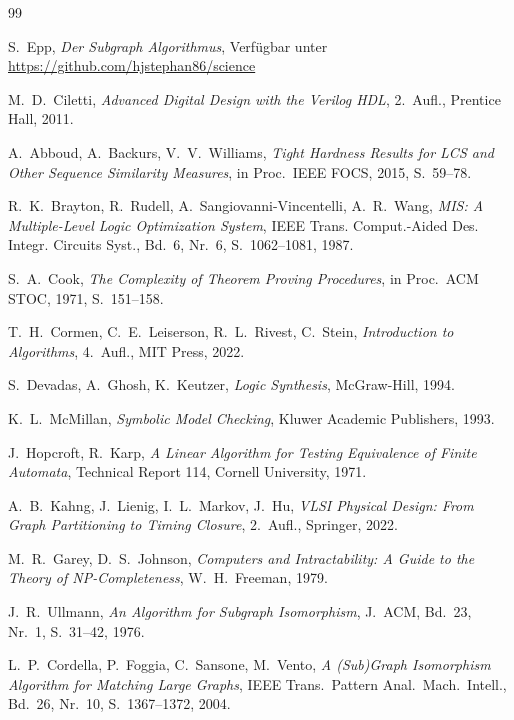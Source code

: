 ﻿\documentclass[a4paper,12pt]{article}
\theoremstyle{definition}
\begin{document}
\begin{thebibliography}{99}

S.~Epp,
\emph{Der Subgraph Algorithmus},
Verfügbar unter \url{https://github.com/hjstephan86/science}

M.~D.~Ciletti,
\emph{Advanced Digital Design with the Verilog HDL},
2.~Aufl., Prentice Hall, 2011.

A.~Abboud, A.~Backurs, V.~V.~Williams,
\emph{Tight Hardness Results for LCS and Other Sequence Similarity Measures},
in Proc.~IEEE FOCS, 2015, S.~59--78.

R.~K.~Brayton, R.~Rudell, A.~Sangiovanni-Vincentelli, A.~R.~Wang,
\emph{MIS: A Multiple-Level Logic Optimization System},
IEEE Trans. Comput.-Aided Des. Integr. Circuits Syst., Bd.~6, Nr.~6, S.~1062--1081, 1987.

S.~A.~Cook,
\emph{The Complexity of Theorem Proving Procedures},
in Proc.~ACM STOC, 1971, S.~151--158.

T.~H.~Cormen, C.~E.~Leiserson, R.~L.~Rivest, C.~Stein,
\emph{Introduction to Algorithms},
4.~Aufl., MIT Press, 2022.

S.~Devadas, A.~Ghosh, K.~Keutzer,
\emph{Logic Synthesis},
McGraw-Hill, 1994.

K.~L.~McMillan,
\emph{Symbolic Model Checking},
Kluwer Academic Publishers, 1993.

J.~Hopcroft, R.~Karp,
\emph{A Linear Algorithm for Testing Equivalence of Finite Automata},
Technical Report 114, Cornell University, 1971.

A.~B.~Kahng, J.~Lienig, I.~L.~Markov, J.~Hu,
\emph{VLSI Physical Design: From Graph Partitioning to Timing Closure},
2.~Aufl., Springer, 2022.


M.~R.~Garey, D.~S.~Johnson,
\emph{Computers and Intractability: A Guide to the Theory of NP-Completeness},
W.~H.~Freeman, 1979.

J.~R.~Ullmann,
\emph{An Algorithm for Subgraph Isomorphism},
J.~ACM, Bd.~23, Nr.~1, S.~31--42, 1976.

L.~P.~Cordella, P.~Foggia, C.~Sansone, M.~Vento,
\emph{A (Sub)Graph Isomorphism Algorithm for Matching Large Graphs},
IEEE Trans.~Pattern Anal.~Mach.~Intell., Bd.~26, Nr.~10, S.~1367--1372, 2004.


\end{thebibliography}
\end{document}
